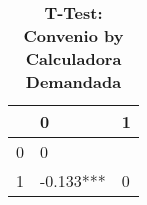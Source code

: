\begin{table}[H]\centering \caption{\textbf{T-Test: Convenio by Calculadora Demandada}}
\begin{tabular}{l*{2}{l}}
\toprule
                     & 0            & 1\\\midrule
0             &      0                   \\
1             & -0.133***    &      0    \\
\bottomrule\end{tabular}
\end{table}
